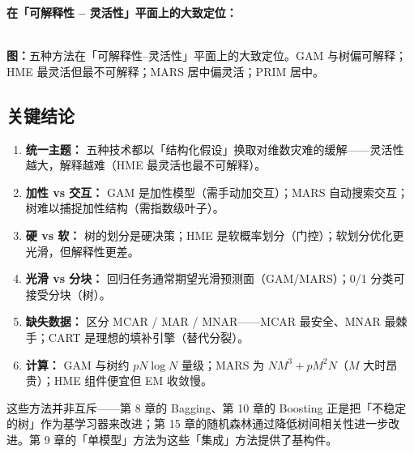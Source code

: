 \begin{center}
\end{center}

\textbf{在「可解释性 – 灵活性」平面上的大致定位：}

\begin{center}
\\[2pt]
\small\textbf{图：}五种方法在「可解释性–灵活性」平面上的大致定位。GAM 与树偏可解释；HME 最灵活但最不可解释；MARS 居中偏灵活；PRIM 居中。
\end{center}

\subsection{关键结论}

\begin{enumerate}
    \item \textbf{统一主题：} 五种技术都以「结构化假设」换取对维数灾难的缓解——灵活性越大，解释越难（HME 最灵活也最不可解释）。
    \item \textbf{加性 vs 交互：} GAM 是加性模型（需手动加交互）；MARS 自动搜索交互；树难以捕捉加性结构（需指数级叶子）。
    \item \textbf{硬 vs 软：} 树的划分是硬决策；HME 是软概率划分（门控）；软划分优化更光滑，但解释性更差。
    \item \textbf{光滑 vs 分块：} 回归任务通常期望光滑预测面（GAM/MARS）；0/1 分类可接受分块（树）。
    \item \textbf{缺失数据：} 区分 MCAR / MAR / MNAR——MCAR 最安全、MNAR 最棘手；CART 是理想的填补引擎（替代分裂）。
    \item \textbf{计算：} GAM 与树约 $pN\log N$ 量级；MARS 为 $NM^3 + pM^2N$（$M$ 大时昂贵）；HME 组件便宜但 EM 收敛慢。
\end{enumerate}

\begin{remark}
    这些方法并非互斥——第 8 章的 Bagging、第 10 章的 Boosting 正是把「不稳定的树」作为基学习器来改进；第 15 章的随机森林通过降低树间相关性进一步改进。第 9 章的「单模型」方法为这些「集成」方法提供了基构件。
\end{remark}
